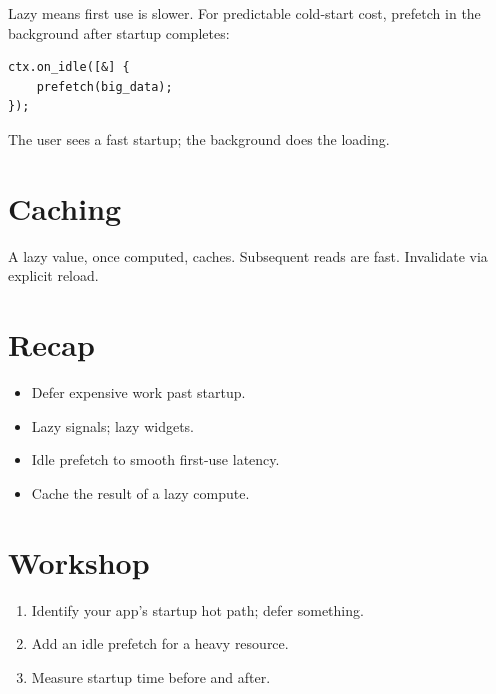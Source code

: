 Lazy means first use is slower. For predictable cold-start
cost, prefetch in the background after startup completes:

\begin{lstlisting}
ctx.on_idle([&] {
    prefetch(big_data);
});
\end{lstlisting}

The user sees a fast startup; the background does the
loading.

\section{Caching}

A lazy value, once computed, caches. Subsequent reads are
fast. Invalidate via explicit reload.

\section{Recap}

\begin{recap}
\begin{itemize}[leftmargin=*]
  \item Defer expensive work past startup.
  \item Lazy signals; lazy widgets.
  \item Idle prefetch to smooth first-use latency.
  \item Cache the result of a lazy compute.
\end{itemize}
\end{recap}

\section*{Workshop}

\begin{enumerate}[leftmargin=*]
  \item Identify your app's startup hot path; defer
    something.
  \item Add an idle prefetch for a heavy resource.
  \item Measure startup time before and after.
\end{enumerate}
